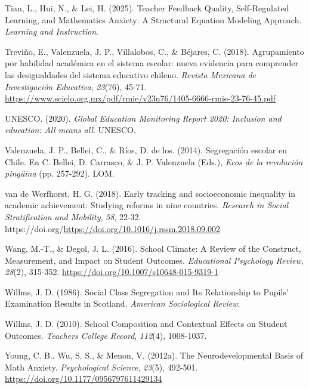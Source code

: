 \documentclass[
  spanish,
  a4paper,
  oneside]{scrbook}
\newlength{\cslhangindent}
\newenvironment{CSLReferences}[2] %
 {\begin{list}{}{%
  \setlength{\itemindent}{0pt}
  \setlength{\leftmargin}{0pt}
  \setlength{\parsep}{0pt}
  \ifodd #1
   \setlength{\leftmargin}{\cslhangindent}
   \setlength{\itemindent}{-1\cslhangindent}
  \fi
  \setlength{\itemsep}{#2\baselineskip}}}
 {\end{list}}
\begin{document}
\begin{CSLReferences}{1}{0}
Tian, L., Hui, N., \& Lei, H. (2025). Teacher Feedback Quality,
Self-Regulated Learning, and Mathematics Anxiety: A Structural Equation
Modeling Approach. \emph{Learning and Instruction}.

Treviño, E., Valenzuela, J. P., Villalobos, C., \& Béjares, C. (2018).
Agrupamiento por habilidad acad{é}mica en el sistema escolar: nueva
evidencia para comprender las desigualdades del sistema educativo
chileno. \emph{Revista Mexicana de Investigaci{ó}n Educativa},
\emph{23}(76), 45-71.
\url{https://www.scielo.org.mx/pdf/rmie/v23n76/1405-6666-rmie-23-76-45.pdf}

UNESCO. (2020). \emph{Global Education Monitoring Report 2020: Inclusion
and education: All means all}. UNESCO.

Valenzuela, J. P., Bellei, C., \& Ríos, D. de los. (2014). Segregaci{ó}n
escolar en Chile. En C. Bellei, D. Carrasco, \& J. P. Valenzuela (Eds.),
\emph{Ecos de la revoluci{ó}n ping{ü}ina} (pp. 257-292). LOM.

van de Werfhorst, H. G. (2018). Early tracking and socioeconomic
inequality in academic achievement: Studying reforms in nine countries.
\emph{Research in Social Stratification and Mobility}, \emph{58}, 22-32.
https://doi.org/\url{https://doi.org/10.1016/j.rssm.2018.09.002}

Wang, M.-T., \& Degol, J. L. (2016). School Climate: A Review of the
Construct, Measurement, and Impact on Student Outcomes.
\emph{Educational Psychology Review}, \emph{28}(2), 315-352.
\url{https://doi.org/10.1007/s10648-015-9319-1}

Willms, J. D. (1986). Social Class Segregation and Its Relationship to
Pupils' Examination Results in Scotland. \emph{American Sociological
Review}.

Willms, J. D. (2010). School Composition and Contextual Effects on
Student Outcomes. \emph{Teachers College Record}, \emph{112}(4),
1008-1037.

Young, C. B., Wu, S. S., \& Menon, V. (2012a). The Neurodevelopmental
Basis of Math Anxiety. \emph{Psychological Science}, \emph{23}(5),
492-501. \url{https://doi.org/10.1177/0956797611429134}


\end{CSLReferences}
\end{document}
